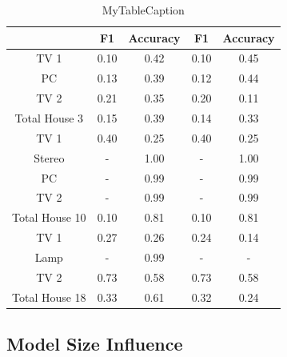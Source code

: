 \begin{table}[H]                             
\centering                                   
\begin{tabular}{|c|c|c|c|c|}                 
\hline                                       
 & F1 & Accuracy & F1 & Accuracy \\          
\hline                                       
TV 1 & 0.10 & 0.42 & 0.10 & 0.45 \\          
\hline                                       
PC & 0.13 & 0.39 & 0.12 & 0.44 \\            
\hline                                       
TV 2 & 0.21 & 0.35 & 0.20 & 0.11 \\          
\hline                                       
Total House 3 & 0.15 & 0.39 & 0.14 & 0.33 \\ 
\hline                                       
TV 1 & 0.40 & 0.25 & 0.40 & 0.25 \\          
\hline                                       
Stereo & - & 1.00 & - & 1.00 \\              
\hline                                       
PC & - & 0.99 & - & 0.99 \\                  
\hline                                       
TV 2 & - & 0.99 & - & 0.99 \\                
\hline                                       
Total House 10 & 0.10 & 0.81 & 0.10 & 0.81 \\
\hline                                       
TV 1 & 0.27 & 0.26 & 0.24 & 0.14 \\          
\hline                                       
Lamp & - & 0.99 & - & - \\                   
\hline                                       
TV 2 & 0.73 & 0.58 & 0.73 & 0.58 \\          
\hline                                       
Total House 18 & 0.33 & 0.61 & 0.32 & 0.24 \\
\hline                                       
\end{tabular}                                
\caption{MyTableCaption}                     
\label{table:Tab:SHGSIMREAL}                 
\end{table}     

\subsection{ Model Size Influence }

